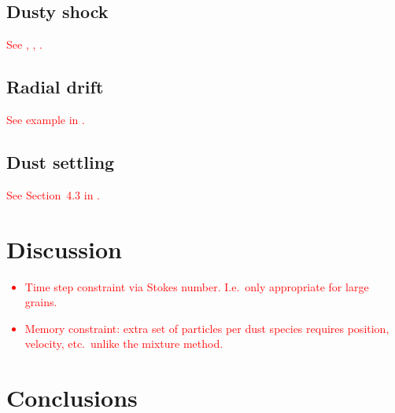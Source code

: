 \documentclass[fleqn,usenatbib]{mnras}
\begin{document}
\subsection{Dusty shock}

\textcolor{red}{
See \citet{Benitez-Llambay2019ApJS..241...25B},
\citet{Laibe2012MNRAS.420.2345L}, \citet{Lehmann2018MNRAS.476.3185L}.
}

\subsection{Radial drift}

\textcolor{red}{
See example in \citet{Dipierro2018MNRAS.479.4187D}.
}

\subsection{Dust settling}

\textcolor{red}{
See Section~4.3 in \citet{Hutchison2018MNRAS.476.2186H}.
}



\section{Discussion}

\textcolor{red}{
\begin{itemize}
   \item Time step constraint via Stokes number. I.e.\ only appropriate for
      large grains.
   \item Memory constraint: extra set of particles per dust species requires
      position, velocity, etc.\ unlike the mixture method.
\end{itemize}
}

\section{Conclusions}
\end{document}

